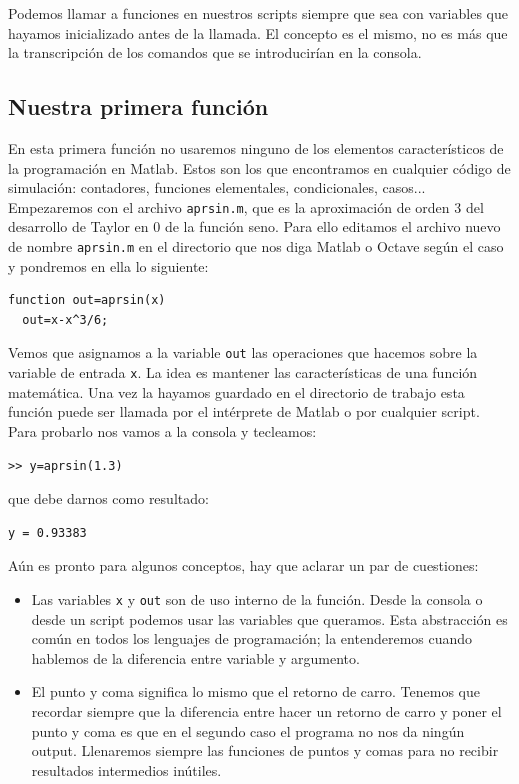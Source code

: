 Podemos llamar a funciones en nuestros scripts siempre que sea con
variables que hayamos inicializado antes de la llamada. El concepto es
el mismo, no es más que la transcripción de los comandos que se
introducirían en la consola.


\subsection{Nuestra primera función}

En esta primera función no usaremos ninguno de los elementos
característicos de la programación en Matlab. Estos son los que
encontramos en cualquier código de simulación: contadores, funciones
elementales, condicionales, casos... Empezaremos con el archivo
\texttt{aprsin.m}, que es la aproximación de orden 3 del desarrollo de
Taylor en 0 de la función seno. Para ello editamos el archivo nuevo de
nombre \texttt{aprsin.m} en el directorio que nos diga Matlab o Octave
según el caso y pondremos en ella lo siguiente:

\begin{verbatim}
function out=aprsin(x)
  out=x-x^3/6;
\end{verbatim}

Vemos que asignamos a la variable \texttt{out} las operaciones
que hacemos sobre la variable de entrada \texttt{x}. La idea es
mantener las características de una función matemática. Una vez la
hayamos guardado en el directorio de trabajo esta función puede ser llamada
por el intérprete de Matlab o por cualquier script.
Para probarlo nos vamos a la consola y tecleamos:

\begin{verbatim}
>> y=aprsin(1.3)
\end{verbatim}
que debe darnos como resultado:

\begin{verbatim}
y = 0.93383
\end{verbatim}
Aún es pronto para algunos conceptos, hay que aclarar un par de
cuestiones:

\begin{itemize}
\item Las variables \texttt{x} y \texttt{out} son de uso interno de la
  función.  Desde la consola o desde un script podemos usar las
  variables que queramos. Esta abstracción es común en todos los
  lenguajes de programación; la entenderemos cuando hablemos de la
  diferencia entre variable y argumento.
\item El punto y coma significa lo mismo que el retorno de carro.
  Tenemos que recordar siempre que la diferencia entre hacer un
  retorno de carro y poner el punto y coma es que en el segundo caso
  el programa no nos da ningún output. Llenaremos siempre las
  funciones de puntos y comas para no recibir resultados intermedios
  inútiles.
\end{itemize}

